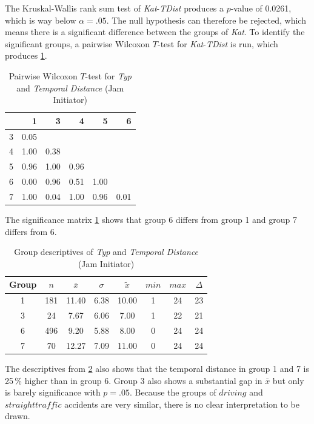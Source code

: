 The Kruskal-Wallis rank sum test of \textit{Kat}-\textit{TDist} produces a $p$-value of 0.0261, which is way below $\alpha=.05$. The null hypothesis can therefore be rejected, which means there is a significant difference between the groups of \textit{Kat}. To identify the significant groups, a pairwise Wilcoxon $T$-test for \textit{Kat}-\textit{TDist} is run, which produces \cref{tbl:wilcoxon_baysis_initiator_Typ_TDist}. 
\begin{table}[ht]
	\tiny
	\centering
    \begin{tabular}{rrrrrr}
        \toprule
        & 1 & 3 & 4 & 5 & 6 \\ 
        \midrule
        3 & 0.05 &  &  &  &  \\ 
        4 & 1.00 & 0.38 &  &  &  \\ 
        5 & 0.96 & 1.00 & 0.96 &  &  \\ 
        6 & 0.00 & 0.96 & 0.51 & 1.00 &  \\ 
        7 & 1.00 & 0.04 & 1.00 & 0.96 & 0.01 \\ 
        \bottomrule
    \end{tabular}
    \caption{Pairwise Wilcoxon $T$-test for \textit{Typ} and \textit{Temporal Distance} (Jam Initiator)}
    \label{tbl:wilcoxon_baysis_initiator_Typ_TDist}
\end{table}
The significance matrix \cref{tbl:wilcoxon_baysis_initiator_Typ_TDist} shows that group 6 differs from group 1 and group 7 differs from 6. 
\begin{table}[ht]
	\tiny
	\centering
    \begin{tabular}{c|c|c|c|c|c|c|c}
        \toprule
        Group & $n$ & $\bar{x}$ & $\sigma$ & $\tilde{x}$ & $min$ & $max$ & $\Delta$ \\
        \midrule
        1 & 181 & 11.40 & 6.38 & 10.00 & 1  & 24 & 23 \\ 
        3 & 24  & 7.67  & 6.06 & 7.00  & 1  & 22 & 21 \\ 
        6 & 496 & 9.20  & 5.88 & 8.00  & 0  & 24 & 24 \\ 
        7 & 70  & 12.27 & 7.09 & 11.00 & 0  & 24 & 24 \\ 
        \bottomrule
    \end{tabular}
    \caption{Group descriptives of \textit{Typ} and \textit{Temporal Distance} (Jam Initiator)}
    \label{tbl:descriptives_baysis_initiator_Typ_TDist}
\end{table}
The descriptives from \cref{tbl:descriptives_baysis_initiator_Typ_TDist} also shows that the temporal distance in group 1 and 7 is 25\,\% higher than in group 6. Group 3 also shows a substantial gap in $\bar{x}$ but only is barely significance with $p=.05$. Because the groups of $driving$ and $straight traffic$ accidents are very similar, there is no clear interpretation to be drawn.

